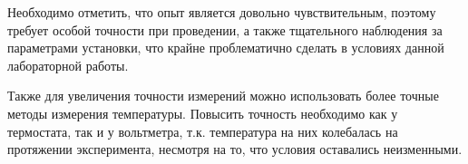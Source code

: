 \documentclass[12pt,a4paper]{article}
\begin{document}
Необходимо отметить, что опыт является довольно чувствительным, поэтому требует особой точности при проведении, а также тщательного наблюдения за параметрами установки, что крайне проблематично сделать в условиях данной лабораторной работы.

Также для увеличения точности измерений можно использовать более точные методы измерения температуры. Повысить точность необходимо как у термостата, так и у вольтметра, т.к. температура на них колебалась на протяжении эксперимента, несмотря на то, что условия оставались неизменными.
\end{document}
